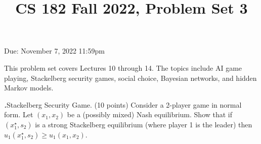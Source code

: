 \documentclass[12pt]{amsart}
\title{CS 182 Fall 2022, Problem Set 3}
\newenvironment{statement}[1]{\smallskip\noindent\color[rgb]{0.0,0.0,0.0} {\bf #1.}}{}
\newcommand{\1}{\mathds{1}}
\begin{document}
\maketitle

\vspace*{-0.25in}
\centerline{Due: November 7, 2022 11:59pm}


\begin{center}
\end{center}
\vspace*{0.15in}


\noindent This problem set covers Lectures 10 through 14. The topics include AI game playing, Stackelberg security games, social choice, Bayesian networks, and hidden Markov models.
\vspace*{0.35in}

\begin{statement}{1} \emph{Stackelberg Security Game.} (10 points) Consider a 2-player game in normal form. Let $(x_1,x_2)$ be a (possibly mixed) Nash equilibrium. Show that if $(x_1^\star,s_2)$ is a strong Stackelberg equilibrium (where player 1 is the leader) then $u_1(x_1^\star,s_2)\geq u_1(x_1,x_2)$.
\end{statement}

\newpage
\end{document}
